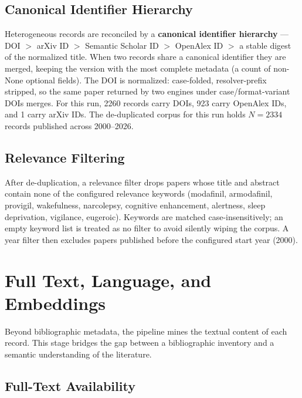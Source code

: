 \documentclass[
  english,
]{article}
\newcounter{none} %
\begin{document}
\subsection{Canonical Identifier
Hierarchy}\label{canonical-identifier-hierarchy}

Heterogeneous records are reconciled by a \textbf{canonical identifier
hierarchy} --- DOI \(>\) arXiv ID \(>\) Semantic Scholar ID \(>\)
OpenAlex ID \(>\) a stable digest of the normalized title. When two
records share a canonical identifier they are merged, keeping the
version with the most complete metadata (a count of non-None optional
fields). The DOI is normalized: case-folded, resolver-prefix stripped,
so the same paper returned by two engines under case/format-variant DOIs
merges. For this run, 2260 records carry DOIs, 923 carry OpenAlex IDs,
and 1 carry arXiv IDs. The de-duplicated corpus for this run holds
\(N = 2334\) records published across 2000--2026.

\subsection{Relevance Filtering}\label{relevance-filtering}

After de-duplication, a relevance filter drops papers whose title and
abstract contain none of the configured relevance keywords (modafinil,
armodafinil, provigil, wakefulness, narcolepsy, cognitive enhancement,
alertness, sleep deprivation, vigilance, eugeroic). Keywords are matched
case-insensitively; an empty keyword list is treated as no filter to
avoid silently wiping the corpus. A year filter then excludes papers
published before the configured start year (2000).

\newpage

\section{Full Text, Language, and
Embeddings}\label{full-text-language-and-embeddings}

Beyond bibliographic metadata, the pipeline mines the textual content of
each record. This stage bridges the gap between a bibliographic
inventory and a semantic understanding of the literature.

\subsection{Full-Text Availability}\label{full-text-availability}
\end{document}

